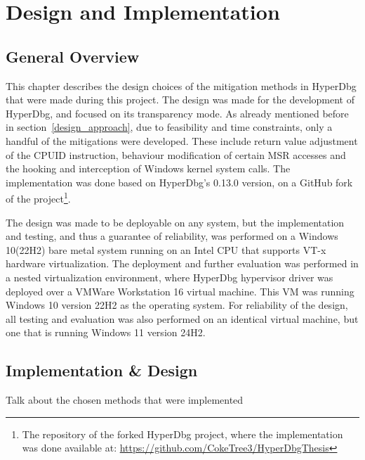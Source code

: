 \section{Design and Implementation}\label{s:design}

\subsection{General Overview}
This chapter describes the design choices of the mitigation methods in HyperDbg that were made during this project. The design was made for the development of HyperDbg, and focused on its transparency mode. 
As already mentioned before in section~\ref{design_approach}, due to feasibility and time constraints, only a handful of the mitigations were developed. 
These include return value adjustment of the CPUID instruction, behaviour modification of certain MSR accesses and the hooking and interception of Windows kernel system calls. 
The implementation was done based on HyperDbg's 0.13.0 version, on a GitHub fork of the project\footnote{The repository of the forked HyperDbg project, where the implementation was done available at: \url{https://github.com/CokeTree3/HyperDbgThesis}}.

The design was made to be deployable on any system, but the implementation and testing, and thus a guarantee of reliability, was performed on a Windows 10(22H2) bare metal system running on an Intel CPU that supports VT-x hardware virtualization. 
The deployment and further evaluation was performed in a nested virtualization environment, where HyperDbg hypervisor driver was deployed over a VMWare Workstation 16 virtual machine. 
This VM was running Windows 10 version 22H2 as the operating system. For reliability of the design, all testing and evaluation was also performed on an identical virtual machine, but one that is running Windows 11 version 24H2.

\subsection{Implementation \& Design}
Talk about the chosen methods that were implemented
